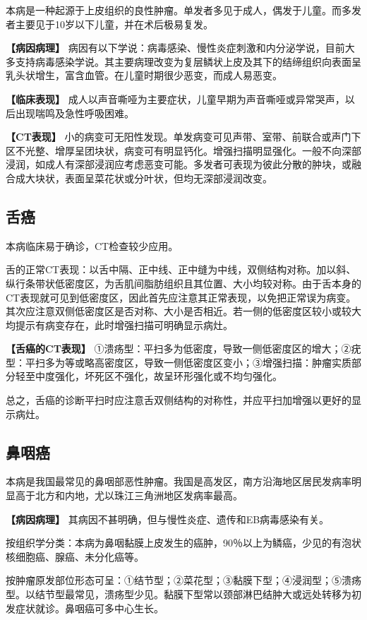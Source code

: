 本病是一种起源于上皮组织的良性肿瘤。单发者多见于成人，偶发于儿童。而多发者主要见于10岁以下儿童，并在术后极易复发。

\textbf{【病因病理】}
病因有以下学说：病毒感染、慢性炎症刺激和内分泌学说，目前大多支持病毒感染学说。其主要病理改变为复层鳞状上皮及其下的结缔组织向表面呈乳头状增生，富含血管。在儿童时期很少恶变，而成人易恶变。

\textbf{【临床表现】}
成人以声音嘶哑为主要症状，儿童早期为声音嘶哑或异常哭声，以后出现喘鸣及急性呼吸困难。

\textbf{【CT表现】}
小的病变可无阳性发现。单发病变可见声带、室带、前联合或声门下区不光整、增厚呈团块状，病变可有明显钙化。增强扫描明显强化。一般不向深部浸润，如成人有深部浸润应考虑恶变可能。多发者可表现为彼此分散的肿块，或融合成大块状，表面呈菜花状或分叶状，但均无深部浸润改变。

\subsection{舌癌}

本病临床易于确诊，CT检查较少应用。

舌的正常CT表现：以舌中隔、正中线、正中缝为中线，双侧结构对称。加以斜、纵行条带状低密度区，为舌肌间脂肪组织且其位置、大小均较对称。由于舌本身的CT表现就可见到低密度区，因此首先应注意其正常表现，以免把正常误为病变。其次应注意双侧低密度区是否对称、大小是否相近。若一侧的低密度区较小或较大均提示有病变存在，此时增强扫描可明确显示病灶。

\textbf{【舌癌的CT表现】}
①溃疡型：平扫多为低密度，导致一侧低密度区的增大；②疣型：平扫多为等或略高密度区，导致一侧低密度区变小；③增强扫描：肿瘤实质部分轻至中度强化，坏死区不强化，故呈环形强化或不均匀强化。

总之，舌癌的诊断平扫时应注意舌双侧结构的对称性，并应平扫加增强以更好的显示病灶。

\subsection{鼻咽癌}

本病是我国最常见的鼻咽部恶性肿瘤。我国是高发区，南方沿海地区居民发病率明显高于北方和内地，尤以珠江三角洲地区发病率最高。

\textbf{【病因病理】}
其病因不甚明确，但与慢性炎症、遗传和EB病毒感染有关。

按组织学分类：本病为鼻咽黏膜上皮发生的癌肿，90％以上为鳞癌，少见的有泡状核细胞癌、腺癌、未分化癌等。

按肿瘤原发部位形态可呈：①结节型；②菜花型；③黏膜下型；④浸润型；⑤溃疡型。以结节型最常见，溃疡型少见。黏膜下型常以颈部淋巴结肿大或远处转移为初发症状就诊。鼻咽癌可多中心生长。

